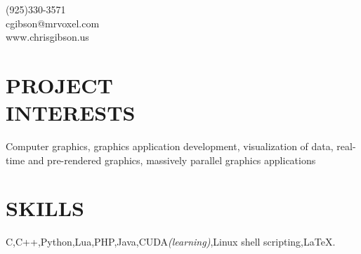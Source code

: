 \documentclass[margin,line]{resume}
\begin{document}
{
	\sc
    \hfill (925)330-3571                  \vspace{0mm}\\\vspace{0mm}%
    \hfill cgibson@mrvoxel.com            \vspace{0mm}\\\vspace{0mm}%
    \hfill www.chrisgibson.us             \vspace{0mm}\\\vspace{-10mm}%
}

\begin{resume}

\vspace{1mm}

    \section{\mysidestyle \textbf{\large{P}\small{ROJECT\\INTERESTS}}}

	Computer graphics, graphics application development, visualization of data, real-time and pre-rendered graphics, massively parallel graphics applications

\sectionline

    \section{\mysidestyle \textbf{\large{S}\small{KILLS}}}

    C,\hspace{2mm}C++,\hspace{2mm}Python,\hspace{2mm}Lua,\hspace{2mm}PHP,\hspace{2mm}Java,\hspace{2mm}CUDA\textsl{\small(learning)},\hspace{2mm}Linux shell scripting,\hspace{2mm}\LaTeX.


\sectionline


\end{resume}
\end{document}
